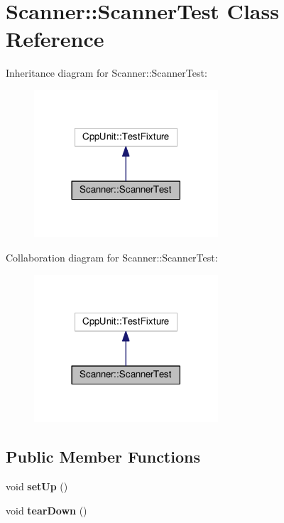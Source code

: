 \hypertarget{class_scanner_1_1_scanner_test}{}\section{Scanner\+:\+:Scanner\+Test Class Reference}
\label{class_scanner_1_1_scanner_test}


Inheritance diagram for Scanner\+:\+:Scanner\+Test\+:
\nopagebreak
\begin{figure}[H]
\begin{center}
\leavevmode
\includegraphics[width=194pt]{class_scanner_1_1_scanner_test__inherit__graph}
\end{center}
\end{figure}


Collaboration diagram for Scanner\+:\+:Scanner\+Test\+:
\nopagebreak
\begin{figure}[H]
\begin{center}
\leavevmode
\includegraphics[width=194pt]{class_scanner_1_1_scanner_test__coll__graph}
\end{center}
\end{figure}
\subsection*{Public Member Functions}
\begin{DoxyCompactItemize}
\item 
void {\bfseries set\+Up} ()\hypertarget{class_scanner_1_1_scanner_test_af1f15a7f621e57f485d905c912ff4669}{}\label{class_scanner_1_1_scanner_test_af1f15a7f621e57f485d905c912ff4669}

\item 
void {\bfseries tear\+Down} ()\hypertarget{class_scanner_1_1_scanner_test_a72e53c25dffb1a798a76c3076c1126de}{}\label{class_scanner_1_1_scanner_test_a72e53c25dffb1a798a76c3076c1126de}

\end{DoxyCompactItemize}
